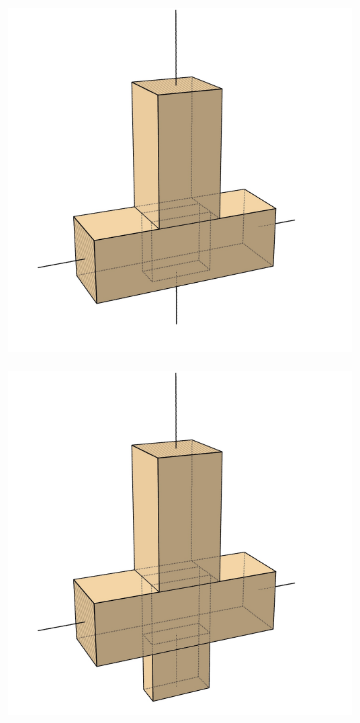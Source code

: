 \documentclass[11pt]{book}
\begin{document}
\begin{figure}[H]
\centering
\begin{subfigure}[b]{0.18\textwidth}
\centering
\includegraphics[width=\textwidth]{./images/image14.jpg}
\end{subfigure}
\hfill
\begin{subfigure}[b]{0.18\textwidth}
\centering
\includegraphics[width=\textwidth]{./images/image19.jpg}

\end{subfigure}
\end{figure}
\end{document}

